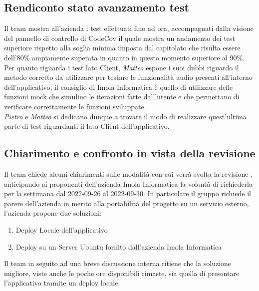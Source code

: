\subsection{Rendiconto stato avanzamento test}
Il team mostra all'azienda i test effettuati fino ad ora, accompagnati dalla visione del pannello di controllo di CodeCov il quale mostra un andamento dei test 
superiore rispetto alla soglia minima imposta dal capitolato che risulta essere dell'80\% ampiamente superata in quanto in questo momento superiore al 90\%. 
\newline Per quanto riguarda i test lato Client, \textit{Matteo} espone i suoi dubbi riguardo il metodo corretto da utilizzare per testare le funzionalità audio
 presenti all'interno dell'applicativo, il consiglio di Imola Informatica è quello di utilizzare delle funzioni mock che simulino le iterazioni fatte dall'utente
  e che permettano di verificare correttamente le funzioni sviluppate. \\
\textit{Pietro} e \textit{Matteo} si dedicano dunque a trovare il modo di realizzare quest'ultima parte di test riguardanti il lato Client dell'applicativo.  

\subsection{Chiarimento e confronto in vista della revisione }
Il team chiede alcuni chiarimenti sulle modalità con cui verrà svolta la revisione , anticipando ai proponenti dell'azienda Imola Informatica la volontà di richiederla per la settimana dal 2022-09-26 al 2022-09-30. 
\newline 
In particolare il gruppo richiede il parere dell'azienda in merito alla portabilità del progetto su un servizio esterno, l'azienda propone due soluzioni:
\begin{enumerate}
    \item Deploy Locale dell'applicativo
    \item Deploy su un Server Ubuntu fornito dall'azienda Imola Informatica 
\end{enumerate}
Il team in seguito ad una breve discussione interna ritiene che la soluzione migliore, viste anche le poche ore disponibili rimaste, sia quella di presentare l'applicativo tramite un deploy locale. 